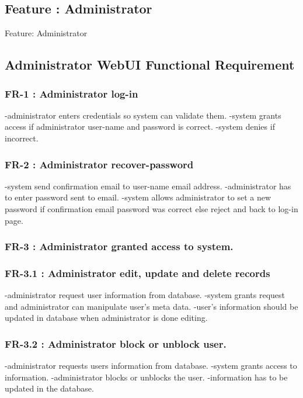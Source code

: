 \begin{Requirements}
\section{Feature : Administrator}
Feature:  Administrator 
\subsection{Administrator WebUI Functional Requirement}

\subsubsection{FR-1  : Administrator log-in}
	  	-administrator enters credentials so system can validate them.
	 	-system grants access if administrator user-name and password is correct.
	 	-system denies if incorrect.
	  
\subsubsection{FR-2   : Administrator recover-password}
		-system send confirmation email to user-name email address.
		-administrator has to enter password sent to email.
	  	-system allows administrator to set a new password if confirmation email password was correct else reject and back to 			 log-in page.
\subsubsection{FR-3   :	Administrator granted access to system.}
  	
\subsubsection{FR-3.1 :	Administrator edit, update and delete records}
		-administrator request user information from database.
		-system grants request and administrator can manipulate user's meta data.
		-user's information should be updated in database when administrator is done editing.
		
\subsubsection{FR-3.2 :	Administrator block or unblock user.}
		-administrator requests users information from database.
		-system grants access to information.
		-administrator blocks or unblocks the user.
		-information has to be updated in the database.
		

\end{Requirements}
